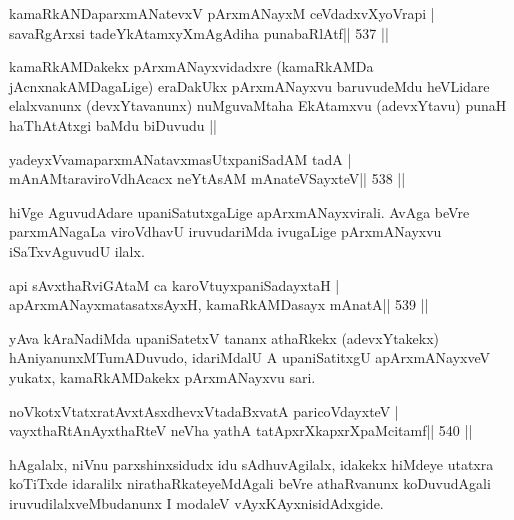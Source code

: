 

\begin{shl}
kamaRkANDaparxmANatevxV pArxmANayxM ceVdadxvXyoVrapi |
savaRgArxsi tadeYkAtamxyXmAgAdiha punabaRlAtf\hfill || 537 ||
\end{shl}

\begin{artha}
kamaRkAMDakekx pArxmANayxvidadxre (kamaRkAMDa jAcnxnakAMDagaLige)
eraDakUkx pArxmANayxvu baruvudeMdu heVLidare elalxvanunx
(devxYtavanunx) nuMguvaMtaha EkAtamxvu (adevxYtavu) punaH haThAtAtxgi
baMdu biDuvudu ||
\end{artha} 



\begin{shl}
yadeyxVvamaparxmANatavxmasUtxpaniSadAM tadA |
mAnAMtaraviroVdhAcacx neYtAsAM mAnateVSayxteV\hfill || 538 ||
\end{shl}

\begin{artha}
hiVge AguvudAdare upaniSatutxgaLige apArxmANayxvirali. AvAga beVre parxmANagaLa viroVdhavU iruvudariMda ivugaLige pArxmANayxvu iSaTxvAguvudU ilalx.
\end{artha}

\begin{shl}
api sAvxthaRviGAtaM ca karoVtuyxpaniSadayxtaH |
apArxmANayxmatasatxsAyxH, kamaRkAMDasayx mAnatA\hfill || 539 ||
\end{shl}

\begin{artha}
yAva kAraNadiMda upaniSatetxV tananx athaRkekx (adevxYtakekx)
hAniyanunxMTumADuvudo, idariMdalU A upaniSatitxgU apArxmANayxveV
yukatx, kamaRkAMDakekx pArxmANayxvu sari.
\end{artha}


\begin{shl}
noVkotxVtatxratAvxtAsxdhevxVtadaBxvatA paricoVdayxteV |
vayxthaRtAnAyxthaRteV neVha yathA tatApxrXkapxrXpaMcitamf\hfill || 540 ||
\end{shl}

\begin{artha}
hAgalalx, niVnu parxshinxsidudx idu sAdhuvAgilalx, idakekx hiMdeye
utatxra koTiTxde idaralilx nirathaRkateyeMdAgali beVre athaRvanunx
koDuvudAgali iruvudilalxveMbudanunx I modaleV vAyxKAyxnisidAdxgide.
\end{artha}

